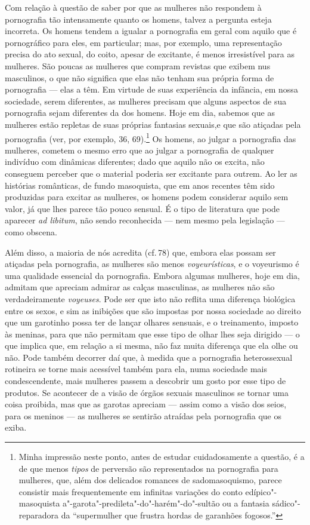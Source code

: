 Com relação à questão de saber por que as mulheres não respondem à
pornografia tão intensamente quanto os homens, talvez a pergunta esteja
incorreta. Os homens tendem a igualar a pornografia em geral com aquilo
que é pornográfico para eles, em particular; mas, por exemplo, uma
representação precisa do ato sexual, do coito, apesar de excitante, é
menos irresistível para as mulheres. São poucas as mulheres que
compram revistas que exibem nus masculinos, o que não significa que
elas não tenham sua própria forma de pornografia --- elas a têm. Em
virtude de suas experiência da infância, em nossa sociedade, serem
diferentes, as mulheres precisam que alguns aspectos de sua pornografia
sejam diferentes da dos homens. Hoje em dia, sabemos que as mulheres
estão repletas de suas próprias fantasias sexuais,\idxfantamulh[|(] e que são atiçadas
pela pornografia (ver, por exemplo, 36, 69).\footnote{ Minha impressão
neste ponto, antes de estudar cuidadosamente a questão, é a de que
menos \textit{tipos} de perversão são representados na pornografia para
mulheres, que, além dos delicados romances de sadomasoquismo, parece
consistir mais frequentemente em infinitas variações do conto
edípico"-masoquista a"-garota"-predileta"-do"-harém"-do"-sultão ou a fantasia
sádico"-reparadora da ``supermulher que frustra hordas de
garanhões fogosos.''} Os homens, ao julgar a pornografia
das mulheres, cometem o mesmo erro que ao julgar a pornografia de
qualquer indivíduo com dinâmicas diferentes; dado que aquilo não os
excita, não conseguem perceber que o material poderia ser excitante
para outrem. Ao ler as histórias românticas, de fundo masoquista, que
em anos recentes têm sido produzidas para excitar as mulheres, os
homens podem considerar aquilo sem valor, já que lhes parece tão pouco
sensual. É o tipo de literatura que pode aparecer \textit{ad libitum},
não sendo reconhecida --- nem mesmo pela legislação --- como obscena.

Além disso, a maioria de nós acredita (cf.\,78) que, embora elas
possam ser atiçadas pela pornografia, as mulheres são menos
\emph{voyeurísticas},\idxvoy{} e o voyeurismo é uma qualidade essencial da pornografia.
Embora algumas mulheres, hoje em dia, admitam que apreciam admirar as
calças masculinas, as mulheres não são verdadeiramente\textit{
\emph{voyeuses}}. Pode ser que isto não reflita uma diferença biológica entre
os sexos, e sim as inibições que são impostas por nossa sociedade ao
direito que um garotinho possa ter de lançar olhares sensuais, e o
treinamento, imposto às meninas, para que não permitam que esse tipo de
olhar lhes seja dirigido --- o que implica que, em relação a si mesma,
não faz muita diferença que ela olhe ou não. Pode também decorrer daí
que, à medida que a pornografia heterossexual rotineira se torne mais
acessível também para ela, numa sociedade mais condescendente, mais
mulheres passem a descobrir um gosto por esse tipo de produtos. Se
acontecer de a visão de órgãos sexuais masculinos\idxpenisporn{} se tornar uma coisa
proibida, mas que as garotas apreciam --- assim como a visão dos
seios, para os meninos --- as mulheres se sentirão atraídas pela
pornografia que os exiba.

